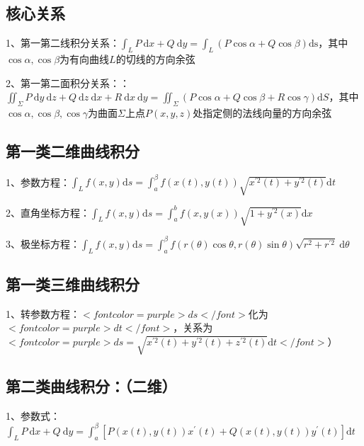 \subsection{核心关系}

1、第一第二线积分关系：$ \int_{L} P \mathrm{~d} x+Q \mathrm{~d} y=\int_{L}(P \cos \alpha+Q \cos \beta) \mathrm{ds} $，其中$ \cos \alpha, \cos \beta $为有向曲线$ L $的切线的方向余弦

2、第一第二面积分关系：：$ \iint_{\Sigma} P \mathrm{~d} y \mathrm{~d} z+Q \mathrm{~d} z \mathrm{~d} x+R \mathrm{~d} x \mathrm{~d} y=\iint_{\Sigma}(P \cos \alpha+Q \cos \beta+R \cos \gamma) \mathrm{d} S $，其中$ \cos \alpha, \cos \beta, \cos \gamma $为曲面$ \Sigma $上点$ P(x, y, z) $处指定侧的法线向量的方向余弦



\subsection{第一类二维曲线积分}

1、参数方程：$ \int_{L} f(x, y) \mathrm{d} s=\int_{a}^{\beta} f(x(t), y(t)) \sqrt{x^{\prime 2}(t)+y^{\prime 2}(t)} \mathrm{d} t $

2、直角坐标方程：$ \int_{L} f(x, y) \mathrm{d} s=\int_{a}^{b} f(x, y(x)) \sqrt{1+y^{\prime 2}(x)} \mathrm{d} x $

3、极坐标方程：$ \int_{L} f(x, y) \mathrm{d} s=\int_{a}^{\beta} f(r(\theta) \cos \theta, r(\theta) \sin \theta) \sqrt{r^{2}+r^{\prime 2}} \mathrm{~d} \theta $



\subsection{第一类三维曲线积分}

1、转参数方程：$ <font color=purple>ds</font> $化为$ <font color=purple>dt</font> $，关系为$ <font color=purple>ds = \sqrt{x^{\prime 2}(t)+y^{\prime 2}(t)+z^{\prime 2}(t)} \mathrm{d} t</font> $）



\subsection{第二类曲线积分：（二维）}

1、参数式：$ \int_{L} P \mathrm{~d} x+Q \mathrm{~d} y=\int_{a}^{\beta}\left[P(x(t), y(t)) x^{\prime}(t)+Q(x(t), y(t)) y^{\prime}(t)\right] \mathrm{d} t $

